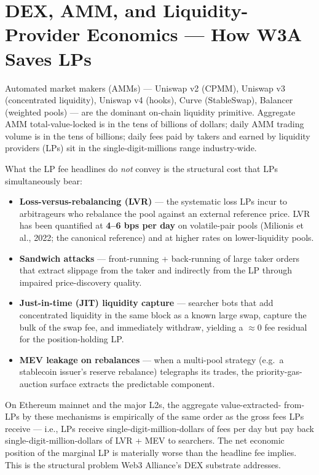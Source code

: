 \section{DEX, AMM, and Liquidity-Provider Economics --- How W3A Saves LPs}

Automated market makers (AMMs) --- Uniswap v2 (CPMM), Uniswap v3
(concentrated liquidity), Uniswap v4 (hooks), Curve (StableSwap),
Balancer (weighted pools) --- are the dominant on-chain liquidity
primitive. Aggregate AMM total-value-locked is in the tens of billions
of dollars; daily AMM trading volume is in the tens of billions; daily
fees paid by takers and earned by liquidity providers (LPs) sit in the
single-digit-millions range industry-wide.

What the LP fee headlines do \emph{not} convey is the structural cost
that LPs simultaneously bear:

\begin{itemize}[leftmargin=2em,itemsep=0.1em]
\item \textbf{Loss-versus-rebalancing (LVR)} --- the systematic loss
LPs incur to arbitrageurs who rebalance the pool against an external
reference price. LVR has been quantified at \textbf{4--6 bps per day}
on volatile-pair pools (Milionis et al., 2022; the canonical reference)
and at higher rates on lower-liquidity pools.
\item \textbf{Sandwich attacks} --- front-running + back-running of
large taker orders that extract slippage from the taker and indirectly
from the LP through impaired price-discovery quality.
\item \textbf{Just-in-time (JIT) liquidity capture} --- searcher bots
that add concentrated liquidity in the same block as a known large
swap, capture the bulk of the swap fee, and immediately withdraw,
yielding a $\approx 0$ fee residual for the position-holding LP.
\item \textbf{MEV leakage on rebalances} --- when a multi-pool
strategy (e.g.\ a stablecoin issuer's reserve rebalance) telegraphs its
trades, the priority-gas-auction surface extracts the predictable
component.
\end{itemize}

On Ethereum mainnet and the major L2s, the aggregate value-extracted-
from-LPs by these mechanisms is empirically of the same order as the
gross fees LPs receive --- i.e., LPs receive single-digit-million-dollars
of fees per day but pay back single-digit-million-dollars of LVR + MEV
to searchers. The net economic position of the marginal LP is
materially worse than the headline fee implies. This is the structural
problem Web3 Alliance's DEX substrate addresses.

